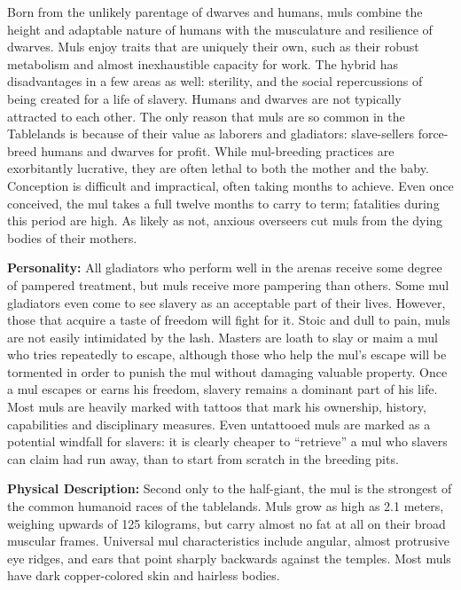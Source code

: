 \begin{figure}[t!]
\WOTC
\end{figure}

Born from the unlikely parentage of dwarves and humans, muls combine the height and adaptable nature of humans with the musculature and resilience of dwarves. Muls enjoy traits that are uniquely their own, such as their robust metabolism and almost inexhaustible capacity for work. The hybrid has disadvantages in a few areas as well: sterility, and the social repercussions of being created for a life of slavery. Humans and dwarves are not typically attracted to each other. The only reason that muls are so common in the Tablelands is because of their value as laborers and gladiators: slave-sellers force-breed humans and dwarves for profit. While mul-breeding practices are exorbitantly lucrative, they are often lethal to both the mother and the baby. Conception is difficult and impractical, often taking months to achieve. Even once conceived, the mul takes a full twelve months to carry to term; fatalities during this period are high. As likely as not, anxious overseers cut muls from the dying bodies of their mothers.

\textbf{Personality:} All gladiators who perform well in the arenas receive some degree of pampered treatment, but muls receive more pampering than others. Some mul gladiators even come to see slavery as an acceptable part of their lives. However, those that acquire a taste of freedom will fight for it. Stoic and dull to pain, muls are not easily intimidated by the lash. Masters are loath to slay or maim a mul who tries repeatedly to escape, although those who help the mul's escape will be tormented in order to punish the mul without damaging valuable property. Once a mul escapes or earns his freedom, slavery remains a dominant part of his life. Most muls are heavily marked with tattoos that mark his ownership, history, capabilities and disciplinary measures. Even untattooed muls are marked as a potential windfall for slavers: it is clearly cheaper to ``retrieve'' a mul who slavers can claim had run away, than to start from scratch in the breeding pits.

\textbf{Physical Description:} Second only to the half-giant, the mul is the strongest of the common humanoid races of the tablelands. Muls grow as high as 2.1 meters, weighing upwards of 125 kilograms, but carry almost no fat at all on their broad muscular frames. Universal mul characteristics include angular, almost protrusive eye ridges, and ears that point sharply backwards against the temples. Most muls have dark copper-colored skin and hairless bodies.

